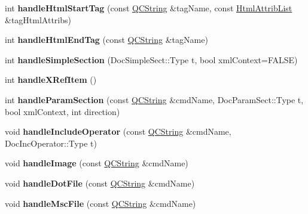 \begin{DoxyCompactItemize}
\item 
\hypertarget{class_doc_para_aae84d445337c17ec41654c0cef59f221}{int {\bfseries handle\-Html\-Start\-Tag} (const \hyperlink{class_q_c_string}{Q\-C\-String} \&tag\-Name, const \hyperlink{class_html_attrib_list}{Html\-Attrib\-List} \&tag\-Html\-Attribs)}\label{class_doc_para_aae84d445337c17ec41654c0cef59f221}

\item 
\hypertarget{class_doc_para_a778e5a7e835ca115b14c98f68dbe1660}{int {\bfseries handle\-Html\-End\-Tag} (const \hyperlink{class_q_c_string}{Q\-C\-String} \&tag\-Name)}\label{class_doc_para_a778e5a7e835ca115b14c98f68dbe1660}

\item 
\hypertarget{class_doc_para_aa1402fc83d107341925d545b7b350534}{int {\bfseries handle\-Simple\-Section} (Doc\-Simple\-Sect\-::\-Type t, bool xml\-Context=F\-A\-L\-S\-E)}\label{class_doc_para_aa1402fc83d107341925d545b7b350534}

\item 
\hypertarget{class_doc_para_ac30f10029ee4c282f1c49de937f4d33a}{int {\bfseries handle\-X\-Ref\-Item} ()}\label{class_doc_para_ac30f10029ee4c282f1c49de937f4d33a}

\item 
\hypertarget{class_doc_para_aab67e10ab6b6ac1b5f607ac5717c488b}{int {\bfseries handle\-Param\-Section} (const \hyperlink{class_q_c_string}{Q\-C\-String} \&cmd\-Name, Doc\-Param\-Sect\-::\-Type t, bool xml\-Context, int direction)}\label{class_doc_para_aab67e10ab6b6ac1b5f607ac5717c488b}

\item 
\hypertarget{class_doc_para_acef9856367355ae85a8c5d96b4b5c5a5}{void {\bfseries handle\-Include\-Operator} (const \hyperlink{class_q_c_string}{Q\-C\-String} \&cmd\-Name, Doc\-Inc\-Operator\-::\-Type t)}\label{class_doc_para_acef9856367355ae85a8c5d96b4b5c5a5}

\item 
\hypertarget{class_doc_para_afaed3ebd951d07067ffda80577aa08b3}{void {\bfseries handle\-Image} (const \hyperlink{class_q_c_string}{Q\-C\-String} \&cmd\-Name)}\label{class_doc_para_afaed3ebd951d07067ffda80577aa08b3}

\item 
\hypertarget{class_doc_para_a1a30a82ed71801e1765208a56779fafb}{void {\bfseries handle\-Dot\-File} (const \hyperlink{class_q_c_string}{Q\-C\-String} \&cmd\-Name)}\label{class_doc_para_a1a30a82ed71801e1765208a56779fafb}

\item 
\hypertarget{class_doc_para_aa553f3eea1480175ba5cb85774329f34}{void {\bfseries handle\-Msc\-File} (const \hyperlink{class_q_c_string}{Q\-C\-String} \&cmd\-Name)}\label{class_doc_para_aa553f3eea1480175ba5cb85774329f34}


\end{DoxyCompactItemize}
